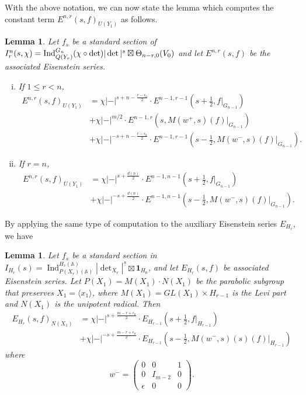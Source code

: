 \documentclass[10pt]{amsart}
\theoremstyle{plain}
\newtheorem{Lem}[equation]{Lemma}
\numberwithin{equation}{section}
\begin{document}
\vskip 10pt

With the above notation, we can now state the lemma which computes the constant term
$E^{n,r}(s,f)_{U(Y_1)}$ as follows.
 \begin{Lem}  \label{L:constant}
 Let $f_s$ be a standard section of $I^n_r(s,\chi)= {\rm
   Ind}_{Q(Y_r)}^{G_n}(\chi \circ \det)  |\det|^s \boxtimes 
 \Theta_{n-r,0}(V_0)$ and let $E^{n,r}(s,f)$ be the associated Eisenstein series.
 \begin{enumerate}[(i)]
 \item If $1 \leq  r < n$,
\begin{align*}
  E^{n,r}(s,f)_{U(Y_1)}    
&=\chi | - |^{s+ n - \frac{r - \epsilon_0}{2} } \cdot E^{n-1,r-1}(s+\frac{1}{2}, f|_{G_{n-1}}) \\
&+ \chi |-|^{m/2} \cdot E^{n-1,r} ( s,  M(w^+,s)(f)|_{G_{n-1}} )\\
&+ \chi |-|^{-s + n - \frac{r- \epsilon_0}{2}} \cdot E^{n-1,r-1}(s -
\frac{1}{2},  M(w^-,s)(f)|_{G_{n-1}}).
\end{align*}
 
 \item If $r =n$, 
 \begin{align*}
  E^{n,r}(s,f)_{U(Y_1)}& = 
  \chi |-|^{s + \frac{d(n)}{2}} \cdot E^{n-1,n-1}(s+ \frac{1}{2},  f|_{G_{n-1}})\\
  &+\chi |-|^{-s +  \frac{d(n)}{2}} \cdot  E^{n-1,n-1}(s -
  \frac{1}{2}, M(w^-,s)(f)|_{G_{n-1}}).
\end{align*}
\end{enumerate}
\end{Lem}
 \vskip 10pt
 
By applying the same type of computation to the auxiliary Eisenstein
series $E_{H_r}$,
we have
\begin{Lem}\label{L:constant_aux}
Let $f_s$ be  a standard section in
$I_{H_r}(s)={\operatorname{Ind}}_{P(X_r)({\mathbb{A}})}^{H_r({\mathbb{A}})}|\det_{X_r}|^s\boxtimes\mathbf{1}_{H_0}$,
and let $E_{H_r}(s, f)$ be associated Eisenstein series. Let
$P(X_1)=M(X_1)\cdot N(X_1)$
be the parabolic subgroup that preserves $X_1=\langle x_1\rangle$, where
$M(X_1)=GL(X_1)\times H_{r-1}$ is the Levi part and $N(X_1)$ is the
unipotent radical. Then 
\begin{align*}
  E_{H_r}(s,f)_{N(X_1)}    
&=\chi | - |^{s+ \frac{m-r +\epsilon_0}{2} } \cdot E_{H_{r-1}}(s+\frac{1}{2}, f|_{H_{r-1}}) \\
&+ \chi |-|^{-s + \frac{m-r+ \epsilon_0}{2}} \cdot
E_{H_{r-1}}(s-\frac{1}{2},  M(w^-,s)(s)(f)|_{H_{r-1}})
\end{align*}
 where 
  \[  w^-  =  \left( \begin{array}{ccc}
 0 & 0 & 1 \\
 0 & I_{m-2} & 0 \\
 \epsilon &  0 & 0 \end{array} \right). \]
 
\end{Lem}
 
\end{document}
